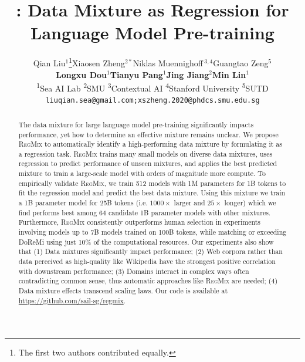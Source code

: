\documentclass{article}
\title{\ourmethod: Data Mixture as Regression for\\Language Model Pre-training}
\author{
Qian Liu$^{1}$\!\thanks{The first two authors contributed equally.}\;\quad Xiaosen Zheng$^{2*}$\quad Niklas Muennighoff$\,^{3,4}$\quad Guangtao Zeng$^5$\\ \textbf{Longxu Dou}$^1$\quad \textbf{Tianyu Pang}$^1$\quad \textbf{Jing Jiang}$^2$\quad \textbf{Min Lin}$^1$ \\
    \textsuperscript{1}Sea AI Lab  \quad \textsuperscript{2}SMU \quad \textsuperscript{3}Contextual AI \quad \textsuperscript{4}Stanford University \quad \textsuperscript{5}SUTD \\
    \texttt{\small liuqian.sea@gmail.com;\;xszheng.2020@phdcs.smu.edu.sg}
}
\theoremstyle{definition}
\theoremstyle{remark}
\newcommand{\ourmethod}{\textsc{RegMix}\xspace}
\begin{document}
\maketitle

\begin{abstract}
The data mixture for large language model pre-training significantly impacts performance, yet how to determine an effective mixture remains unclear.
We propose \ourmethod to automatically identify a high-performing data mixture by formulating it as a regression task. \ourmethod trains many small models on diverse data mixtures, uses regression to predict performance of unseen mixtures, and applies the best predicted mixture to train a large-scale model with orders of magnitude more compute.
To empirically validate \ourmethod, we train 512 models with 1M parameters for 1B tokens to fit the regression model and predict the best data mixture. Using this mixture we train a 1B parameter model for 25B tokens (i.e. $1000 \times$ larger and $25 \times$ longer) which we find performs best among 64 candidate 1B parameter models with other mixtures.
Furthermore, \ourmethod consistently outperforms human selection in experiments involving models up to 7B models trained on 100B tokens, while matching or exceeding DoReMi using just 10\% of the computational resources.
Our experiments also show that (1) Data mixtures significantly impact performance; (2) Web corpora rather than data perceived as high-quality like Wikipedia have the strongest positive correlation with downstream performance; (3) Domains interact in complex ways often contradicting common sense, thus automatic approaches like \ourmethod are needed; (4) Data mixture effects transcend scaling laws. Our code is available at \url{https://github.com/sail-sg/regmix}.

\end{abstract}

\end{document}
